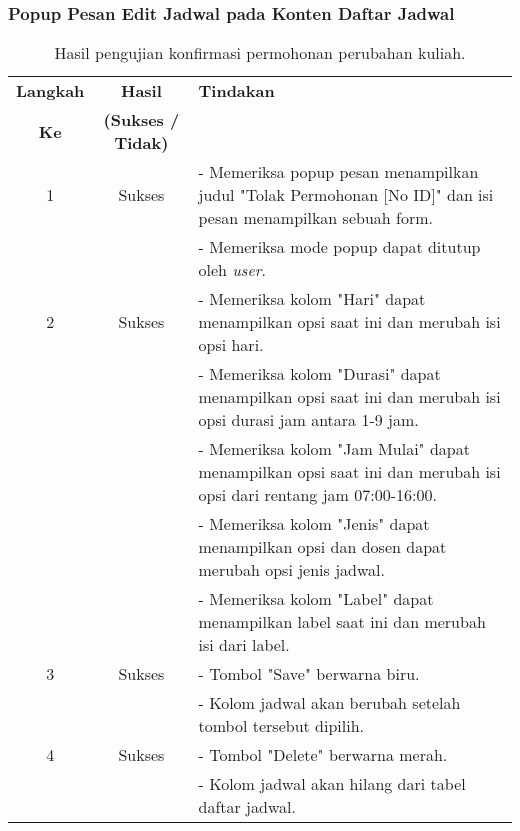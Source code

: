 \subsubsection{Popup Pesan Edit Jadwal pada Konten Daftar Jadwal}
\begin{table}[H]
	\centering 
	\caption{Hasil pengujian konfirmasi permohonan perubahan kuliah.}
	\label{hasil:EditJadwal}
	\begin{tabular}{|c| c| p{}|}
		\toprule
		\textbf{Langkah} & \textbf{Hasil} & \textbf{Tindakan}\\
		\textbf{Ke} & \textbf{(Sukses / Tidak)} &\\
		\midrule
		1&Sukses& - Memeriksa popup pesan menampilkan judul "Tolak Permohonan [No ID]" dan isi pesan menampilkan sebuah form.\\
		&& - Memeriksa mode popup dapat ditutup oleh \textit{user}.\\
		\hline
		2&Sukses& - Memeriksa kolom "Hari" dapat menampilkan opsi saat ini dan merubah isi opsi hari.\\
		&& - Memeriksa kolom "Durasi" dapat menampilkan opsi saat ini dan merubah isi  opsi durasi jam antara 1-9 jam.\\
		&& - Memeriksa kolom "Jam Mulai" dapat menampilkan opsi saat ini dan merubah isi opsi dari rentang jam 07:00-16:00.\\
		&& - Memeriksa kolom "Jenis" dapat menampilkan opsi dan dosen dapat merubah opsi jenis jadwal.\\
		&& - Memeriksa kolom "Label" dapat menampilkan label saat ini dan merubah isi dari label.\\
		\hline
		3&Sukses&- Tombol "Save" berwarna biru.\\
		&& - Kolom jadwal akan berubah setelah tombol tersebut dipilih.\\
		\hline
		4&Sukses&- Tombol "Delete" berwarna merah.\\
		&& - Kolom jadwal akan hilang dari tabel daftar jadwal.\\		
		\bottomrule		
	\end{tabular} 
\end{table}


